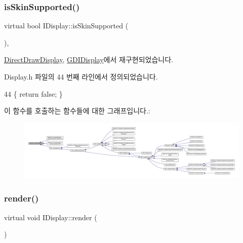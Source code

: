 \subsubsection{\texorpdfstring{is\+Skin\+Supported()}{isSkinSupported()}}
{\footnotesize\ttfamily virtual bool I\+Display\+::is\+Skin\+Supported (\begin{DoxyParamCaption}{ }\end{DoxyParamCaption})\hspace{0.3cm}{\ttfamily [inline]}, {\ttfamily [virtual]}}



\mbox{\hyperlink{class_direct_draw_display_af98136de6311fb224288f7e7cbb36106}{Direct\+Draw\+Display}}, \mbox{\hyperlink{class_g_d_i_display_aa6c3c9482950413829f81f1aadae9929}{G\+D\+I\+Display}}에서 재구현되었습니다.



Display.\+h 파일의 44 번째 라인에서 정의되었습니다.


\begin{DoxyCode}
44 \{ \textcolor{keywordflow}{return} \textcolor{keyword}{false}; \}
\end{DoxyCode}
이 함수를 호출하는 함수들에 대한 그래프입니다.\+:
\nopagebreak
\begin{figure}[H]
\begin{center}
\leavevmode
\includegraphics[width=350pt]{class_i_display_ad717007b624f0a8e7c830ab803cd8a92_icgraph}
\end{center}
\end{figure}
\mbox{\label{class_i_display_af61c440b97da313a502e86346a729b03}} 
\subsubsection{\texorpdfstring{render()}{render()}}
{\footnotesize\ttfamily virtual void I\+Display\+::render (\begin{DoxyParamCaption}{ }\end{DoxyParamCaption})\hspace{0.3cm}{\ttfamily [pure virtual]}}




